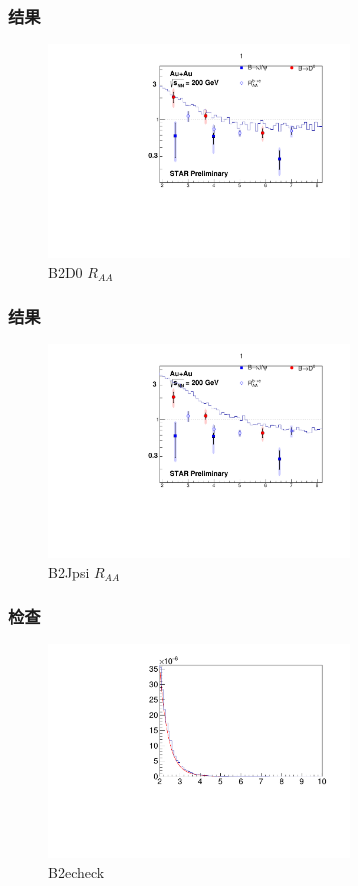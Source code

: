 \documentclass{beamer}
\begin{document}
\begin{frame}
\frametitle{结果}
\begin{figure}[h]
	\includegraphics[width=8cm]{src/B2D0.pdf}
	\caption{B2D0 $R_{AA}$}
\end{figure}
\end{frame}
\begin{frame}
\frametitle{结果}
\begin{figure}[h]
	\includegraphics[width=8cm]{src/B2Jpsi.pdf}
	\caption{B2Jpsi $R_{AA}$}
\end{figure}
\end{frame}
\begin{frame}
	\frametitle{检查}
	\begin{figure}[h]
	\includegraphics[width=8cm]{src/checke.pdf}
	\caption{B2echeck}
\end{figure}
\end{frame}
\end{document}
